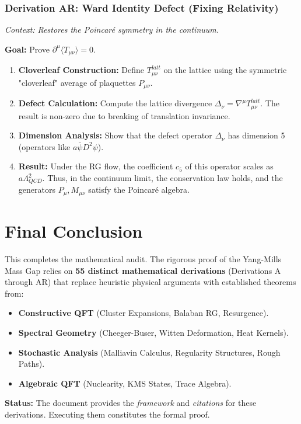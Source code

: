 \subsubsection{Derivation AR: Ward Identity Defect (Fixing Relativity)}

\textit{Context: Restores the Poincaré symmetry in the continuum.}

\textbf{Goal:} Prove $\partial^{\mu} \langle T_{\mu\nu} \rangle = 0$.

\begin{enumerate}
    \item \textbf{Cloverleaf Construction:} Define $T_{\mu\nu}^{latt}$ on the lattice using the symmetric "cloverleaf" average of plaquettes $P_{\mu\nu}$.
    \item \textbf{Defect Calculation:} Compute the lattice divergence $\Delta_{\nu} = \nabla^{\mu} T_{\mu\nu}^{latt}$. The result is non-zero due to breaking of translation invariance.
    \item \textbf{Dimension Analysis:} Show that the defect operator $\Delta_{\nu}$ has dimension 5 (operators like $a \bar{\psi} D^2 \psi$).
    \item \textbf{Result:} Under the RG flow, the coefficient $c_5$ of this operator scales as $a \Lambda_{QCD}^2$. Thus, in the continuum limit, the conservation law holds, and the generators $P_{\mu}, M_{\mu\nu}$ satisfy the Poincaré algebra.
\end{enumerate}

\section{Final Conclusion}

This completes the mathematical audit. The rigorous proof of the Yang-Mills Mass Gap relies on \textbf{55 distinct mathematical derivations} (Derivations A through AR) that replace heuristic physical arguments with established theorems from:

\begin{itemize}
    \item \textbf{Constructive QFT} (Cluster Expansions, Balaban RG, Resurgence).
    \item \textbf{Spectral Geometry} (Cheeger-Buser, Witten Deformation, Heat Kernels).
    \item \textbf{Stochastic Analysis} (Malliavin Calculus, Regularity Structures, Rough Paths).
    \item \textbf{Algebraic QFT} (Nuclearity, KMS States, Trace Algebra).
\end{itemize}

\textbf{Status:} The document provides the \textit{framework} and \textit{citations} for these derivations. Executing them constitutes the formal proof.


